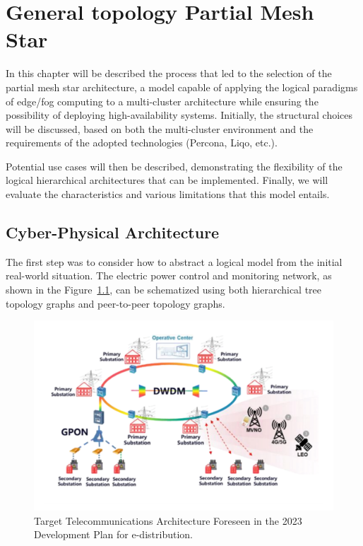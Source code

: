 \chapter{General topology Partial Mesh Star}\label{chap:partial-mesh-star}
In this chapter will be described the process that led to the selection of the partial mesh star architecture, a model capable of applying the logical paradigms of edge/fog computing to a multi-cluster architecture while ensuring the possibility of deploying high-availability systems. Initially, the structural choices will be discussed, based on both the multi-cluster environment and the requirements of the adopted technologies (Percona, Liqo, etc.).

Potential use cases will then be described, demonstrating the flexibility of the logical hierarchical architectures that can be implemented. Finally, we will evaluate the characteristics and various limitations that this model entails.

\section{Cyber-Physical Architecture}
The first step was to consider how to abstract a logical model from the initial real-world situation. The electric power control and monitoring network, as shown in the Figure~\ref{fig:real-net}, can be schematized using both hierarchical tree topology graphs and peer-to-peer topology graphs.

\begin{figure}[ht]\centering
\includegraphics[scale=0.6]{Pictures/real-scheme-net}
\caption{Target Telecommunications Architecture Foreseen in the 2023 Development Plan for e-distribution.}\label{fig:real-net}
\end{figure}

